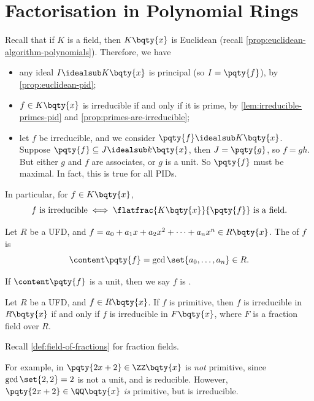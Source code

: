 \section{Factorisation in Polynomial Rings}

Recall that if \(K\) is a field, then \(K\bqty{x}\) is Euclidean (recall \autoref{prop:euclidean-algorithm-polynomials}). Therefore, we have
\begin{itemize}
    \item any ideal \(I \idealsub K\bqty{x}\) is principal (so \(I = \pqty{f}\)), by \autoref{prop:euclidean-pid};
    \item \(f \in K\bqty{x}\) is irreducible if and only if it is prime, by \autoref{lem:irreducible-primes-pid} and \autoref{prop:primes-are-irreducible};
    \item let \(f\) be irreducible, and we consider \(\pqty{f} \idealsub K\bqty{x}\). Suppose \(\pqty{f} \subseteq J \idealsub k\bqty{x}\), then \(J = \pqty{g}\), so \(f = gh\). But either \(g\) and \(f\) are associates, or \(g\) is a unit. So \(\pqty{f}\) must be maximal. In fact, this is true for all PIDs.
\end{itemize}

In particular, for \(f \in K\bqty{x}\),
\[
    f \text{ is irreducible} \iff \flatfrac{K\bqty{x}}{\pqty{f}} \text{ is a field}.
\]

\begin{definition}
    \label{def:content-polynomial-primitive}%
    Let \(R\) be a UFD, and \(f = a_0 + a_1 x + a_2 x^2 + \cdots + a_n x^n\in R\bqty{x}\). The  of \(f\) is
    \[
        \content\pqty{f} = \gcd\set{a_0, \ldots, a_n} \in R.
    \]

    If \(\content\pqty{f}\) is a unit, then we say \(f\) is .
\end{definition}

\begin{theorem}
    \label{thm:gauss-lemma}%
    Let \(R\) be a UFD, and \(f \in R\bqty{x}\). If \(f\) is primitive, then \(f\) is irreducible in \(R \bqty{x}\) if and only if \(f\) is irreducible in \(F\bqty{x}\), where \(F\) is a fraction field over \(R\).
\end{theorem}

Recall \autoref{def:field-of-fractions} for fraction fields.

\begin{remark}
    For example, in \(\pqty{2x + 2} \in \ZZ\bqty{x}\) is \emph{not} primitive, since \(\gcd\set{2, 2} = 2\) is not a unit, and is reducible. However, \(\pqty{2x + 2} \in \QQ\bqty{x}\) \emph{is} primitive, but is irreducible.
\end{remark}

